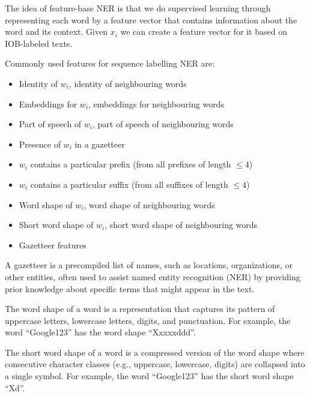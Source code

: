 The idea of feature-base NER is that we do supervised learning through
representing each word by a feature vector that contains information about
the word and its context. Given $x_i$ we can create a feature vector for it
based on IOB-labeled texts.

Commonly used features for sequence labelling NER are:
\begin{itemize}
  \item Identity of $w_i$, identity of neighbouring words
  \item Embeddings for $w_i$, embeddings for neighbouring words
  \item Part of speech of $w_i$, part of speech of neighbouring words
  \item Presence of $w_i$ in a gazetteer
  \item $w_i$ contains a particular prefix (from all prefixes of
    length $\leq 4$)
  \item $w_i$ contains a particular suffix (from all suffixes of
    length $\leq 4$)
  \item Word shape of $w_i$, word shape of neighbouring words
  \item Short word shape of $w_i$, short word shape of neighbouring words
  \item Gazetteer features
\end{itemize}

\begin{definition}[gazetteer]
  A gazetteer is a precompiled list of names, such as locations,
  organizations, or other entities, often used to assist named entity
  recognition (NER) by providing prior knowledge about specific terms
  that might appear in the text.
\end{definition}

\begin{definition}
  The word shape of a word is a representation that captures its
  pattern of uppercase letters, lowercase letters, digits, and
  punctuation. For example, the word ``Google123'' has the word shape
  ``Xxxxxddd''.
\end{definition}

\begin{definition}
  The short word shape of a word is a compressed version of the word
  shape where consecutive character classes (e.g., uppercase,
  lowercase, digits) are collapsed into a single symbol. For example,
  the word ``Google123'' has the short word shape ``Xd''.
\end{definition}

